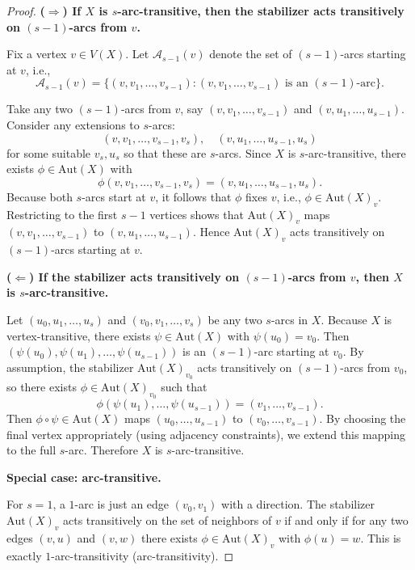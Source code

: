 \documentclass[12pt,a4paper,openany]{book}
\begin{document}
\begin{proof}
 
\noindent \textbf{($\Rightarrow$) If $X$ is $s$-arc-transitive, then the
stabilizer acts transitively on $(s-1)$-arcs from $v$.}  

Fix a vertex $v \in V(X)$. Let $\mathcal{A}_{s-1}(v)$ denote the set of
$(s-1)$-arcs starting at $v$, i.e.,
\[
\mathcal{A}_{s-1}(v) = \{(v,v_1,\dots,v_{s-1}) : (v,v_1,\dots,v_{s-1}) \text{ is an $(s-1)$-arc}\}.
\]

Take any two $(s-1)$-arcs from $v$, say
$(v,v_1,\dots,v_{s-1})$ and $(v,u_1,\dots,u_{s-1})$. Consider
any extensions to $s$-arcs:
\[
(v,v_1,\dots,v_{s-1},v_s), \quad (v,u_1,\dots,u_{s-1},u_s)
\]
for some suitable $v_s,u_s$ so that these are $s$-arcs. Since $X$ is
$s$-arc-transitive, there exists $\phi \in \mathrm{Aut}(X)$ with
\[
\phi(v,v_1,\dots,v_{s-1},v_s) = (v,u_1,\dots,u_{s-1},u_s).
\]
Because both $s$-arcs start at $v$, it follows that $\phi$ fixes $v$,
i.e., $\phi \in \mathrm{Aut}(X)_v$. Restricting to the first $s-1$
vertices shows that $\mathrm{Aut}(X)_v$ maps $(v,v_1,\dots,v_{s-1})$ to
$(v,u_1,\dots,u_{s-1})$. Hence $\mathrm{Aut}(X)_v$ acts transitively on
$(s-1)$-arcs starting at $v$.

\medskip

\noindent \textbf{($\Leftarrow$) If the stabilizer acts transitively on
$(s-1)$-arcs from $v$, then $X$ is $s$-arc-transitive.}  

Let $(u_0,u_1,\dots,u_s)$ and $(v_0,v_1,\dots,v_s)$ be any two
$s$-arcs in $X$. Because $X$ is vertex-transitive, there exists
$\psi \in \mathrm{Aut}(X)$ with $\psi(u_0) = v_0$. Then
$(\psi(u_0),\psi(u_1),\dots,\psi(u_{s-1}))$ is an $(s-1)$-arc starting
at $v_0$. By assumption, the stabilizer $\mathrm{Aut}(X)_{v_0}$ acts
transitively on $(s-1)$-arcs from $v_0$, so there exists $\phi \in
\mathrm{Aut}(X)_{v_0}$ such that
\[
\phi(\psi(u_1),\dots,\psi(u_{s-1})) = (v_1,\dots,v_{s-1}).
\]
Then $\phi \circ \psi \in \mathrm{Aut}(X)$ maps $(u_0,\dots,u_{s-1})$ to
$(v_0,\dots,v_{s-1})$. By choosing the final vertex appropriately
(using adjacency constraints), we extend this mapping to the full
$s$-arc. Therefore $X$ is $s$-arc-transitive.

\medskip

\noindent \textbf{Special case: arc-transitive.}  

For $s=1$, a $1$-arc is just an edge $(v_0,v_1)$ with a direction. The
stabilizer $\mathrm{Aut}(X)_v$ acts transitively on the set of neighbors
of $v$ if and only if for any two edges $(v,u)$ and $(v,w)$ there exists
$\phi \in \mathrm{Aut}(X)_v$ with $\phi(u)=w$. This is exactly
$1$-arc-transitivity (arc-transitivity).

\end{proof}
\end{document}
